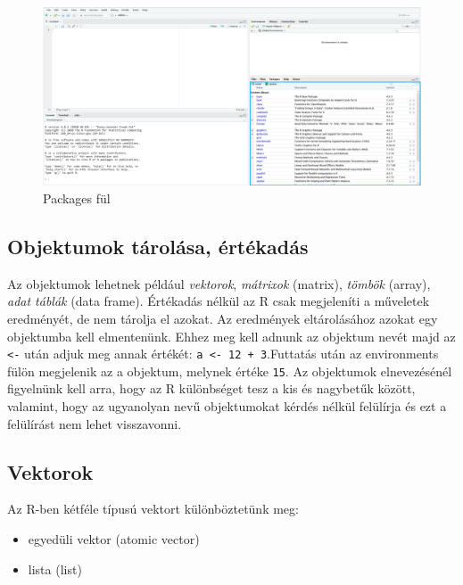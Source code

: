 \documentclass[
]{book}
\providecommand{\tightlist}{%
  \setlength{\itemsep}{0pt}\setlength{\parskip}{0pt}}
\begin{document}
\begin{figure}

{\centering \includegraphics[width=0.9\linewidth]{figures/13-04_packages} 

}

\caption{Packages fül}\label{fig:unnamed-chunk-47}
\end{figure}

\hypertarget{objektumok-tuxe1roluxe1sa-uxe9rtuxe9kaduxe1s}{%
\subsection{Objektumok tárolása,
értékadás}\label{objektumok-tuxe1roluxe1sa-uxe9rtuxe9kaduxe1s}}

Az objektumok lehetnek például \emph{vektorok}, \emph{mátrixok}
(matrix), \emph{tömbök} (array), \emph{adat táblák} (data frame).
Értékadás nélkül az R csak megjeleníti a műveletek eredményét, de nem
tárolja el azokat. Az eredmények eltárolásához azokat egy objektumba
kell elmentenünk. Ehhez meg kell adnunk az objektum nevét majd az
\texttt{\textless{}-} után adjuk meg annak értékét:
\texttt{a\ \textless{}-\ 12\ +\ 3}.Futtatás után az environments fülön
megjelenik az a objektum, melynek értéke \texttt{15}. Az objektumok
elnevezésénél figyelnünk kell arra, hogy az R különbséget tesz a kis és
nagybetűk között, valamint, hogy az ugyanolyan nevű objektumokat kérdés
nélkül felülírja és ezt a felülírást nem lehet visszavonni.

\hypertarget{vektorok}{%
\subsection{Vektorok}\label{vektorok}}

Az R-ben kétféle típusú vektort különböztetünk meg:

\begin{itemize}
\tightlist
\item
  egyedüli vektor (atomic vector)
\item
  lista (list)
\end{itemize}
\end{document}
